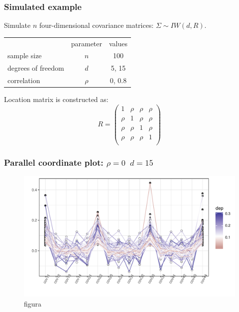 \documentclass[9pt]{beamer}\usepackage[]{graphicx}\usepackage[]{color}
\makeatletter
\def\maxwidth{ %
  \ifdim\Gin@nat@width>\linewidth
    \linewidth
  \else
    \Gin@nat@width
  \fi
}
\newenvironment{kframe}{%
 \def\at@end@of@kframe{}%
 \ifinner\ifhmode%
  \def\at@end@of@kframe{\end{minipage}}%
  \begin{minipage}{\columnwidth}%
 \fi\fi%
 \def\FrameCommand##1{\hskip\@totalleftmargin \hskip-\fboxsep
 \colorbox{shadecolor}{##1}\hskip-\fboxsep
     \hskip-\linewidth \hskip-\@totalleftmargin \hskip\columnwidth}%
 \MakeFramed {\advance\hsize-\width
   \@totalleftmargin\z@ \linewidth\hsize
   \@setminipage}}%
 {\par\unskip\endMakeFramed%
 \at@end@of@kframe}
\newenvironment{knitrout}{}{} %
\makeatother
\begin{document}
\begin{frame}[fragile]
\frametitle{ Simulated example }

Simulate $n$ four-dimensional covariance matrices: $\Sigma \sim IW(d, R)$.  

\begin{tabular}{lcc}
 & parameter & values \\
 sample size & $n$ & 100 \\
 degrees of freedom & $d$ & 5, 15 \\
 correlation & $\rho$ & 0, 0.8
\end{tabular}
\vspace{1cm}

Location matrix is constructed as: 
\[ R =  \begin{pmatrix} 
1 & \rho & \rho & \rho \\ 
\rho & 1 & \rho & \rho \\ 
\rho & \rho & 1 &  \rho \\ 
\rho & \rho & \rho &1  \\ 
\end{pmatrix} \]

\end{frame}



\begin{frame}[fragile]
\frametitle{ Parallel coordinate plot: $\rho = 0 \;\; d=15$ }
\begin{knitrout}
\color{fgcolor}\begin{kframe}


{\ttfamily\noindent\itshape{}}\end{kframe}\begin{figure}
\includegraphics[width=\maxwidth]{figure/unnamed-chunk-7-1} \caption[figura]{figura}\label{fig:unnamed-chunk-7}
\end{figure}


\end{knitrout}
\end{frame}
\end{document}
